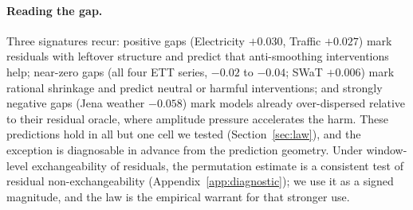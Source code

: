 \paragraph{Reading the gap.}
Three signatures recur: positive gaps (Electricity $+0.030$, Traffic $+0.027$) mark residuals with leftover structure and predict that anti-smoothing interventions help; near-zero gaps (all four ETT series, $-0.02$ to $-0.04$; SWaT $+0.006$) mark rational shrinkage and predict neutral or harmful interventions; and strongly negative gaps (Jena weather $-0.058$) mark models already over-dispersed relative to their residual oracle, where amplitude pressure accelerates the harm. These predictions hold in all but one cell we tested (Section~\ref{sec:law}), and the exception is diagnosable in advance from the prediction geometry. Under window-level exchangeability of residuals, the permutation estimate is a consistent test of residual non-exchangeability (Appendix~\ref{app:diagnostic}); we use it as a signed magnitude, and the law is the empirical warrant for that stronger use.
